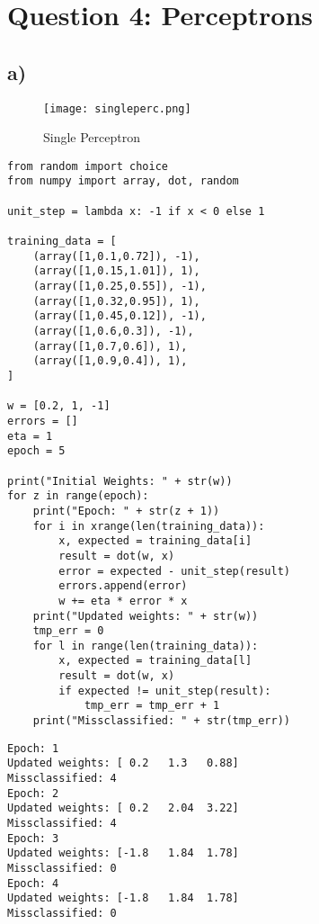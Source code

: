 \section*{Question 4: Perceptrons}



\subsection*{a)}
\begin{figure}[H]
\caption{Single Perceptron}
\texttt{[image: singleperc.png]}
\centering
\end{figure}


\begin{lstlisting}[float=h,frame=tb,caption=Perceptron Code,label=zebra]
from random import choice
from numpy import array, dot, random

unit_step = lambda x: -1 if x < 0 else 1

training_data = [
    (array([1,0.1,0.72]), -1),
    (array([1,0.15,1.01]), 1),
    (array([1,0.25,0.55]), -1),
    (array([1,0.32,0.95]), 1),
    (array([1,0.45,0.12]), -1),
    (array([1,0.6,0.3]), -1),
    (array([1,0.7,0.6]), 1),
    (array([1,0.9,0.4]), 1),
]

w = [0.2, 1, -1]
errors = []
eta = 1
epoch = 5

print("Initial Weights: " + str(w))
for z in range(epoch):
    print("Epoch: " + str(z + 1))
    for i in xrange(len(training_data)):
        x, expected = training_data[i]
        result = dot(w, x)
        error = expected - unit_step(result)
        errors.append(error)
        w += eta * error * x
    print("Updated weights: " + str(w))
    tmp_err = 0
    for l in range(len(training_data)):
        x, expected = training_data[l]
        result = dot(w, x)
        if expected != unit_step(result):
            tmp_err = tmp_err + 1
    print("Missclassified: " + str(tmp_err))
\end{lstlisting}

\begin{lstlisting}[float=h,frame=tb,caption=Code output,label=zebra]
Epoch: 1
Updated weights: [ 0.2   1.3   0.88]
Missclassified: 4
Epoch: 2
Updated weights: [ 0.2   2.04  3.22]
Missclassified: 4
Epoch: 3
Updated weights: [-1.8   1.84  1.78]
Missclassified: 0
Epoch: 4
Updated weights: [-1.8   1.84  1.78]
Missclassified: 0
\end{lstlisting}


